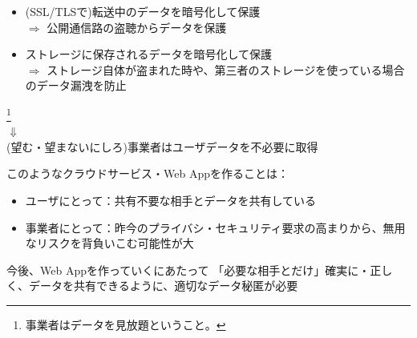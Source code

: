 \documentclass[12pt,dvipdfmx]{beamer}
\begin{document}
\begin{frame}
\begin{itemize}
 \item (SSL/TLSで)転送中のデータを暗号化して保護\\
 $\Rightarrow$ 公開通信路の盗聴からデータを保護
 \item ストレージに保存されるデータを暗号化して保護\\
 $\Rightarrow$ ストレージ自体が盗まれた時や、第三者のストレージを使っている場合のデータ漏洩を防止%
\end{itemize}
\begin{center}
 \footnote[frame]{事業者はデータを見放題ということ。}\\
 $\Downarrow$\\
 \alert{(望む・望まないにしろ)事業者はユーザデータを不必要に取得}
\end{center}
\end{frame}

\begin{frame}
このようなクラウドサービス・Web Appを作ることは：

\begin{itemize}
\item ユーザにとって：共有不要な相手とデータを共有している
\item 事業者にとって：昨今のプライバシ・セキュリティ要求の高まりから、\alert{無用なリスクを背負いこむ可能性が大}
\end{itemize}

\begin{alertblock}{\small 今後、Web Appを作っていくにあたって}
「必要な相手とだけ」確実に・正しく、データを共有できるように、適切なデータ秘匿が必要
\end{alertblock}
\end{frame}
\end{document}
